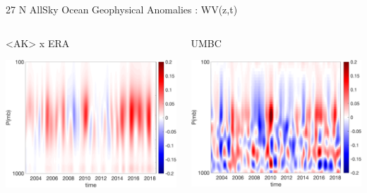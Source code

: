 \documentclass[10pt,t]{beamer}
\begin{document}
\begin{frame}{27 N AllSky Ocean Geophysical Anomalies : WV(z,t)}
\begin{columns}
\begin{column}{0.55\columnwidth}
\begin{block}{\footnotesize <AK> x ERA}
\vspace{-0.1in}
\begin{center}
\includegraphics[width=0.95\linewidth]{Figs/CloudAnom/Desc_ocean/ak_x_ntropics27_era_cld_wv_anom_200209_201808.png}
\end{center}
\end{block}
\end{column}

\begin{column}{0.55\columnwidth}
\begin{block}{\footnotesize UMBC}
\vspace{-0.1in}
\begin{center}
\includegraphics[width=0.95\linewidth]{Figs/CloudAnom/Desc_ocean/ntropic27N_umbc_cld_retr_obs_wv_anom_200209_201808.png}
\end{center}
\end{block}
\end{column}
\end{columns}

\end{frame}
\end{document}
